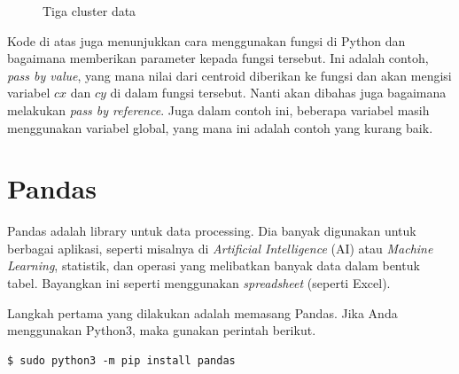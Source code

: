 \begin{figure}[ht]
   \caption{Tiga cluster data}
   \label{fig:clustercreate}
\end{figure}

Kode di atas juga menunjukkan cara menggunakan fungsi di Python dan bagaimana
memberikan parameter kepada fungsi tersebut.
Ini adalah contoh, {\em pass by value}, yang mana nilai dari centroid
diberikan ke fungsi dan akan mengisi variabel $cx$ dan $cy$ di dalam fungsi
tersebut.
Nanti akan dibahas juga bagaimana melakukan {\em pass by reference}.
Juga dalam contoh ini, beberapa variabel masih menggunakan variabel global,
yang mana ini adalah contoh yang kurang baik.

\section{Pandas}
Pandas adalah library untuk data processing. Dia banyak digunakan untuk
berbagai aplikasi, seperti misalnya di {\em Artificial Intelligence}
(AI) atau {\em Machine Learning}, statistik, dan operasi yang melibatkan
banyak data dalam bentuk tabel.
Bayangkan ini seperti menggunakan {\em spreadsheet} (seperti Excel).

Langkah pertama yang dilakukan adalah memasang Pandas.
Jika Anda menggunakan Python3, maka gunakan perintah berikut.
\begin{verbatim}
$ sudo python3 -m pip install pandas
\end{verbatim}

